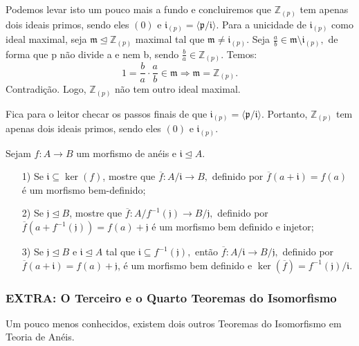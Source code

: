 \documentclass[algebraII_notes.tex]{subfiles}
\begin{document}
\begin{example}
	Podemos levar isto um pouco mais a fundo e concluiremos que \(\mathbb{Z}_{(p)}\) tem apenas dois ideais primos, sendo eles \((0)\) e \(\mathfrak{i}_{(p)}=\langle \mathfrak{p}/\mathfrak{i} \rangle.\)
	Para a unicidade de \(\mathfrak{i}_{(p)}\) como ideal maximal, seja \(\mathfrak{m}\trianglelefteq \mathbb{Z}_{(p)}\) maximal tal que \(\mathfrak{m}\neq \mathfrak{i}_{(p)}\). Seja
	\(\frac{a}{b}\in \mathfrak{m}\setminus{\mathfrak{i}_{(p)}},\) de forma que p não divide a e nem b, sendo \(\frac{b}{a}\in \mathbb{Z}_{(p)}\). Temos:
	\[
		1 = \frac{b}{a}\cdot \frac{a}{b}\in \mathfrak{m}\Rightarrow \mathfrak{m}=\mathbb{Z}_{(p)}.
	\]
	Contradição. Logo, \(\mathbb{Z}_{(p)}\) não tem outro ideal maximal.

	Fica para o leitor checar os passos finais de que \(\mathfrak{i}_{(p)} = \langle \mathfrak{p}/\mathfrak{i} \rangle.\) Portanto, \(\mathbb{Z}_{(p)}\) tem apenas
	dois ideais primos, sendo eles \((0)\) e \(\mathfrak{i}_{(p)}.\)
\end{example}
\begin{prop*}[Exercício]
	Sejam \(f:A\rightarrow B\) um morfismo de anéis e \(\mathfrak{i}\trianglelefteq{A}.\)
	\begin{itemize}
		\item[1)] Se \(\mathfrak{i}\subseteq \ker{(f)}\), mostre que \(\overline{f}:A/\mathfrak{i}\rightarrow B,\) definido por \(\overline{f}(a+\mathfrak{i}) = f(a)\) é
		      um morfismo bem-definido;
		\item[2)] Se \(\mathfrak{j}\trianglelefteq{B}\), mostre que \(\overline{f}:A/f^{-1}(\mathfrak{j})\rightarrow B/\mathfrak{j},\) definido por
		      \(\overline{f}(a+f^{-1}(\mathfrak{j})) = f(a) + \mathfrak{j}\) é um morfismo bem definido e injetor;
		\item[3)] Se \(\mathfrak{j}\trianglelefteq{B}\) e \(\mathfrak{i}\trianglelefteq{A}\) tal que \(\mathfrak{i}\subseteq f^{-1}(\mathfrak{j}),\) então
		      \(\overline{f}:A/\mathfrak{i}\rightarrow B/\mathfrak{j}, \) definido por \(\overline{f}(a+\mathfrak{i})=f(a)+\mathfrak{j}\),
		      é um morfismo bem definido e \(\ker{(\overline{f})} = f^{-1}(\mathfrak{j})/\mathfrak{i}.\)
	\end{itemize}
\end{prop*}
\subsubsection{EXTRA: O Terceiro e o Quarto Teoremas do Isomorfismo}
Um pouco menos conhecidos, existem dois outros Teoremas do Isomorfismo em Teoria de Anéis.
\end{document}
